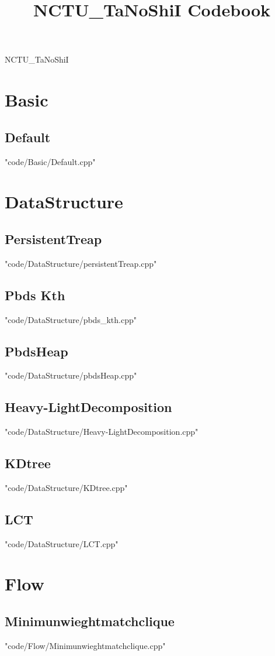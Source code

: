 \documentclass [8pt,a4paper,twocolumn]{article}
\title {NCTU\_TaNoShiI Codebook}
\begin{document}
\thispagestyle{fancy}
{ \Huge NCTU\_TaNoShiI}
\tableofcontents

\section{Basic}
\subsection{Default}
 {"code/Basic/Default.cpp"}
\section{DataStructure}
\subsection{PersistentTreap}
 {"code/DataStructure/persistentTreap.cpp"}
\subsection{Pbds Kth}
 {"code/DataStructure/pbds_kth.cpp"}
\subsection{PbdsHeap}
 {"code/DataStructure/pbdsHeap.cpp"}
\subsection{Heavy-LightDecomposition}
 {"code/DataStructure/Heavy-LightDecomposition.cpp"}
\subsection{KDtree}
 {"code/DataStructure/KDtree.cpp"}
\subsection{LCT}
 {"code/DataStructure/LCT.cpp"}
\section{Flow}
\subsection{Minimunwieghtmatchclique}
 {"code/Flow/Minimunwieghtmatchclique.cpp"}
\end{document}
